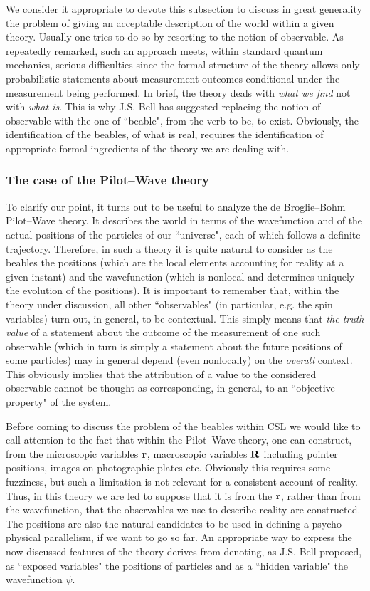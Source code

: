 \documentclass[10pt,a4paper]{article}
\begin{document}
We consider it appropriate to devote this subsection to discuss in
great generality the problem of giving an acceptable description
of the world within a given theory. Usually one tries to do so by
resorting to the notion of observable. As repeatedly remarked,
such an approach meets, within standard quantum mechanics, serious
difficulties since the formal structure of the theory allows only
probabilistic statements about measurement outcomes conditional
under the measurement being performed. In brief, the theory deals
with {\it what we find} not with {\it what is}. This is why J.S.
Bell has suggested \cite{bell84}  replacing  the notion of
observable with the one of ``beable", from the verb to be, to
exist. Obviously, the identification of the beables, of what is
real, requires the identification of appropriate formal
ingredients of the theory we are dealing with.


\subsubsection{The case of the Pilot--Wave theory}
\label{sec1251}

To clarify our point, it turns out to be useful to analyze the de
Broglie--Bohm Pilot--Wave theory. It describes the world in terms
of the wavefunction and of the actual positions of the particles
of our ``universe", each of which follows a definite trajectory.
Therefore, in such a theory it is quite natural to consider as the
beables the positions (which are the local elements accounting for
reality at a given instant) and the wavefunction (which is
nonlocal and determines uniquely the evolution of the positions).
It is important to remember that, within the theory under
discussion, all other ``observables" (in particular, e.g. the spin
variables) turn out, in general, to be contextual. This simply
means that {\it the truth value} of a statement about the outcome
of the measurement of one such observable (which in turn is simply
a statement about the future positions of some particles) may in
general depend (even nonlocally) on the {\it overall} context.
This obviously implies that the attribution of a value to the
considered observable cannot be thought as corresponding, in
general, to an ``objective property" of the system.

Before coming to discuss the problem of the beables within CSL we
would like to call attention to the fact that \cite{bellqg} within
the Pilot--Wave theory, one can construct, from the microscopic
variables ${\bf r}$, macroscopic variables ${\bf R}$ including
pointer positions, images on photographic plates etc. Obviously
this requires some fuzziness, but such a limitation is not
relevant for a consistent account of reality. Thus, in this theory
we are led to suppose that it is from the ${\bf r}$, rather than
from the wavefunction, that the observables we use to describe
reality are constructed. The positions are also the natural
candidates to be used in defining a psycho--physical parallelism,
if we want to go so far. An appropriate way to express the now
discussed features of the theory derives from denoting, as J.S.
Bell proposed, as ``exposed variables" the positions of particles
and as a ``hidden variable" the wavefunction $\psi$.
\end{document}
